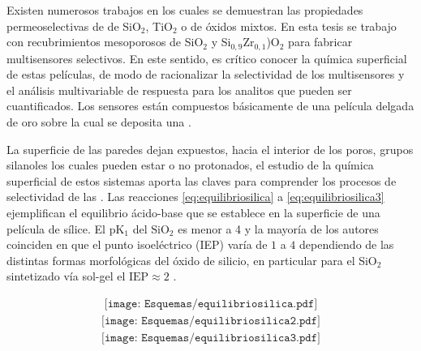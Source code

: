 	Existen numerosos trabajos en los cuales se demuestran las propiedades permeoselectivas de \pdm\space de SiO$_2$, TiO$_2$ o de óxidos mixtos.\cite{walcarius2013,Andrieu-Brunsen2015,Etienne2013,Calvo2009,brunsen2011} En esta tesis se trabajo con recubrimientos mesoporosos de SiO$_2$ y Si$_{0,9}$Zr$_{0,1}$)O$_2$ para fabricar multisensores selectivos. En este sentido, es crítico conocer la química superficial de estas películas, de modo de racionalizar la selectividad de los multisensores y el análisis multivariable de respuesta para los analitos que pueden ser cuantificados. Los sensores están compuestos básicamente de una película delgada de oro sobre la cual se deposita una \pdm. 

	La superficie de las paredes dejan expuestos, hacia el interior de los poros, grupos silanoles los cuales pueden estar o no protonados, el estudio de la química superficial de estos sistemas aporta las claves para comprender los procesos de selectividad de las \pdm.\cite{Brinker1990,Soler-Illia2011} Las reacciones \ref{eq:equilibriosilica} a \ref{eq:equilibriosilica3} ejemplifican el equilibrio ácido-base que se establece en la superficie de una película de sílice.\cite{Lowe2015} El pK$_{1}$ del $\text{SiO}_2$ es menor a 4 y la mayoría de los autores coinciden en que el punto isoeléctrico (IEP) varía de $1$ a $4$ dependiendo de  las distintas formas morfológicas del óxido de silicio, en particular para el SiO$_2$ sintetizado vía sol-gel el $\text{IEP}\approx 2$ \cite{Kosmulski2002,Kosmulski2014,Schwarz1984,Si-HanWu2013}.

			\vspace*{-4mm}
			\begin{equation}
				\begin{aligned}
				\texttt{[image: Esquemas/equilibriosilica.pdf]}
				\label{eq:equilibriosilica}
				\end{aligned}
				\end{equation}
			\vspace*{-4mm}	
			\begin{equation}
				\begin{aligned}
				\texttt{[image: Esquemas/equilibriosilica2.pdf]}
				\label{eq:equilibriosilica2}
				\end{aligned}
				\end{equation}
			\vspace*{-4mm}	
			\begin{equation}
				\begin{aligned}
				\texttt{[image: Esquemas/equilibriosilica3.pdf]}
				\label{eq:equilibriosilica3}
				\end{aligned}
				\end{equation}		
		    \vspace*{-4mm}


